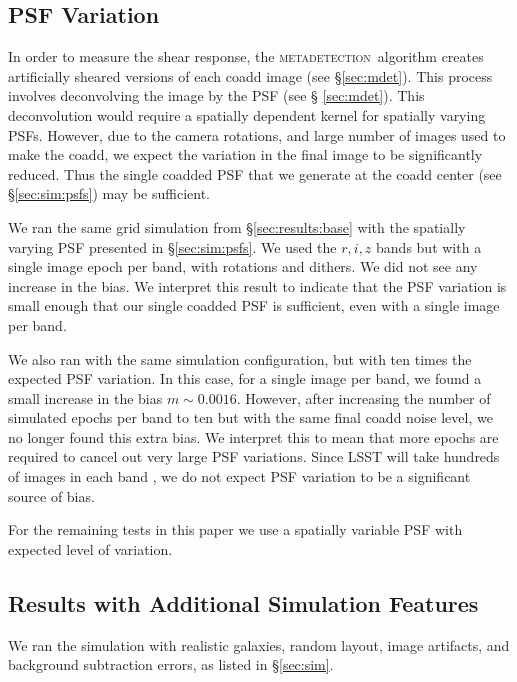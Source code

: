 \documentclass[twocolumn,twocolappendix,astrosym]{openjournal}
\newcommand{\mdet}{\textsc{metadetection}}
\begin{document}
\subsection{PSF Variation} \label{sec:results:psfvar}

In order to measure the shear response, the \mdet\ algorithm creates
artificially sheared versions of each coadd image (see \S \ref{sec:mdet}).
This process involves deconvolving the image by the PSF (see \S
\ref{sec:mdet}).  This deconvolution would require a spatially dependent kernel
for spatially varying PSFs.  However, due to the camera rotations, and large
number of images used to make the coadd, we expect the variation in the final
image to be significantly reduced.  Thus the single coadded PSF that we
generate at the coadd center (see \S \ref{sec:sim:psfs}) may be sufficient.

We ran the same grid simulation from \S \ref{sec:results:base} with the
spatially varying PSF presented in \S \ref{sec:sim:psfs}. We used the $r, i, z$
bands but with a single image epoch per band, with rotations and dithers.  We
did not see any increase in the bias.   We interpret this result to indicate
that the PSF variation is small enough that our single coadded PSF is
sufficient, even with a single image per band.

We also ran with the same simulation configuration, but with ten times the
expected PSF variation. In this case, for a single image per band, we found a
small increase in the bias $m \sim 0.0016$.  However, after increasing the
number of simulated epochs per band to ten but with the same final coadd noise
level, we no longer found this extra bias.  We interpret this to mean that more
epochs are required to cancel out very large PSF variations.  Since LSST will
take hundreds of images in each band \citep{IvezicLSST2008}, we do not
expect PSF variation to be a significant source of bias.

For the remaining tests in this paper we use a spatially variable PSF with
expected level of variation.

\subsection{Results with Additional Simulation Features} \label{sec:results:more}

We ran the simulation with realistic galaxies, random layout, image
artifacts, and background subtraction errors, as listed in \S \ref{sec:sim}.
\end{document}

